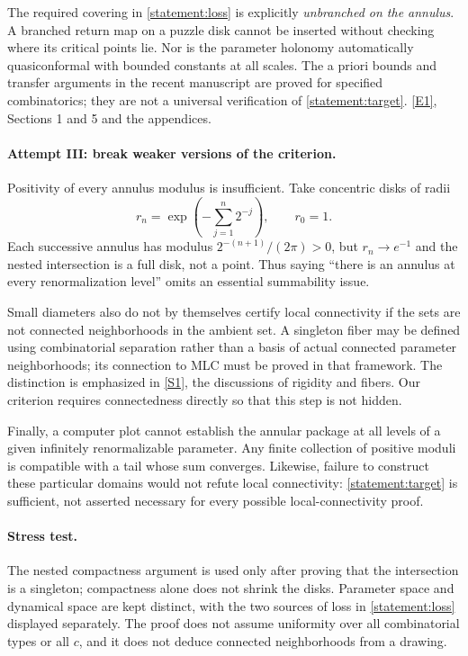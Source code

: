 \documentclass[11pt,a4paper]{article}
\newcommand{\sref}[2]{\hyperlink{source:#1:#2}{[S#2]}}
\newcommand{\eref}[2]{\hyperlink{extra:#1:#2}{[E#2]}}
\numberwithin{equation}{section}
\begin{document}
The required covering in \eqref{statement:loss} is explicitly \emph{unbranched
on the annulus}.  A branched return map on a puzzle disk cannot be
inserted without checking where its critical points lie.  Nor is the
parameter holonomy automatically quasiconformal with bounded constants
at all scales.  The a priori bounds and transfer arguments in the
recent manuscript are proved for specified combinatorics; they are
not a universal verification of \eqref{statement:target}.
\eref{statement}{1}, Sections 1 and 5 and the appendices.

\paragraph{Attempt III: break weaker versions of the criterion.}
Positivity of every annulus modulus is insufficient.  Take concentric
disks of radii
\[
 r_n=\exp\!\left(-\sum_{j=1}^{n}2^{-j}\right),\qquad r_0=1.
\]
Each successive annulus has modulus $2^{-(n+1)}/(2\pi)>0$, but
$r_n\to e^{-1}$ and the nested intersection is a full disk, not a
point.  Thus saying ``there is an annulus at every renormalization
level'' omits an essential summability issue.

Small diameters also do not by themselves certify local connectivity
if the sets are not connected neighborhoods in the ambient set.
A singleton fiber may be defined using combinatorial separation rather
than a basis of actual connected parameter neighborhoods; its
connection to MLC must be proved in that framework.  The distinction
is emphasized in \sref{statement}{1}, the discussions of rigidity and fibers.
Our criterion requires connectedness directly so that this step is
not hidden.

Finally, a computer plot cannot establish the annular package at all
levels of a given infinitely renormalizable parameter.  Any finite
collection of positive moduli is compatible with a tail whose sum
converges.  Likewise, failure to construct these particular domains
would not refute local connectivity: \eqref{statement:target} is sufficient,
not asserted necessary for every possible local-connectivity proof.

\paragraph{Stress test.}
The nested compactness argument is used only after proving that the
intersection is a singleton; compactness alone does not shrink the
disks.  Parameter space and dynamical space are kept distinct, with
the two sources of loss in \eqref{statement:loss} displayed separately.
The proof does not assume uniformity over all combinatorial types or
all $c$, and it does not deduce connected neighborhoods from a drawing.
\end{document}
